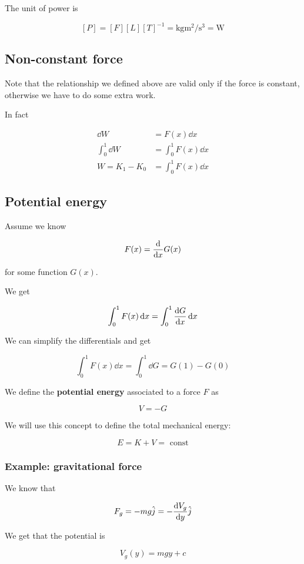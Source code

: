 \documentclass[10pt]{extarticle}
\begin{document}
The unit of power is

$$
    [P] = [F][L][T]^{-1} = \si{\kilogram \meter \squared \per \second \cubed} = \si{\watt}
$$

\subsection{Non-constant force}

Note that the relationship we defined above are valid only if the force is constant, otherwise we have to do some extra work.

In fact

\begin{align*}
    \dd{W}          & = F(x) \dd{x}          \\
    \int_0^1 \dd{W} & = \int_0^1 F(x) \dd{x} \\
    W = K_1 - K_0   & = \int_0^1 F(x) \dd{x}
\end{align*}

\subsection{Potential energy}

Assume we know

$$
    F(x) = \dv{x} G(x)
$$

for some function $G(x)$.

We get

$$
    \int_0^1 F(x) \dd{x} = \int_0^1 \dv{G}{x} \dd{x}
$$

We can simplify the differentials and get

$$
    \int_0^1 F(x) \dd{x} = \int_0^1 \dd{G} = G(1) - G(0)
$$

We define the \textbf{potential energy} associated to a force $F$ as

$$
    V = - G
$$

We will use this concept to define the total mechanical energy:

$$
    E = K + V = \text{ const}
$$


\subsubsection{Example: gravitational force}

We know that

$$
    F_g = - m g \hat j = - \dv{V_g}{y}(y) \hat j
$$

We get that the potential is

$$
    V_g(y) = m g y + c
$$
\end{document}
